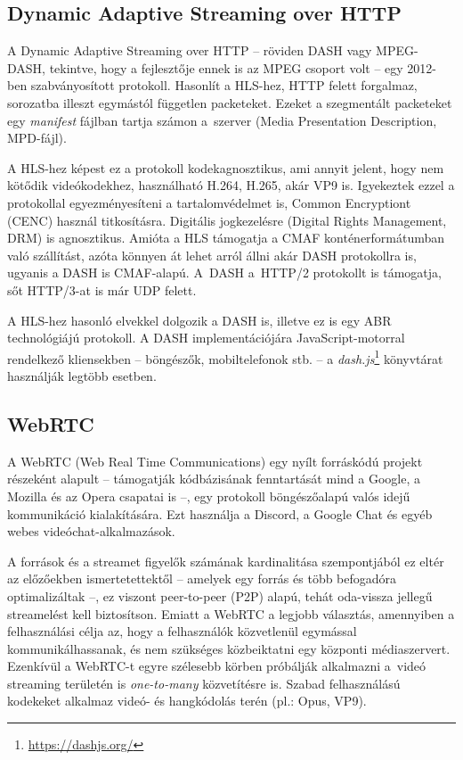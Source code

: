 \subsection{Dynamic Adaptive Streaming over HTTP}

A Dynamic Adaptive Streaming over HTTP -- röviden DASH vagy MPEG-DASH, tekintve, hogy a fejlesztője ennek is az MPEG csoport volt -- egy 2012-ben szabványosított protokoll. Hasonlít a HLS-hez, HTTP felett forgalmaz, sorozatba illeszt egymástól független packeteket. Ezeket a szegmentált packeteket egy \emph{manifest} fájlban tartja számon a~szerver (Media Presentation Description, MPD-fájl).\cite{Dash}

A HLS-hez képest ez a protokoll kodekagnosztikus, ami annyit jelent, hogy nem kötődik videókodekhez, használható H.264, H.265, akár VP9 is.\cite{DashIso} Igyekeztek ezzel a protokollal egyezményesíteni a tartalomvédelmet is, Common Encryptiont (CENC) használ titkosításra. Digitális jogkezelésre (Digital Rights Management, DRM) is agnosztikus. Amióta a HLS támogatja a CMAF konténerformátumban való szállítást, azóta könnyen át lehet arról állni akár DASH protokollra is, ugyanis a DASH is CMAF-alapú. A~DASH a~HTTP/2 protokollt is támogatja, sőt HTTP/3-at is már UDP felett.

A HLS-hez hasonló elvekkel dolgozik a DASH is, illetve ez is egy ABR technológiájú protokoll. A DASH implementációjára JavaScript-motorral rendelkező kliensekben -- böngészők, mobiltelefonok stb. -- a \emph{dash.js}\footnote{\url{https://dashjs.org/}} könyvtárat használják legtöbb esetben.

\subsection{WebRTC}

A WebRTC (Web Real Time Communications) egy nyílt forráskódú projekt részeként alapult -- támogatják kódbázisának fenntartását mind a Google, a Mozilla és az Opera csapatai is --, egy protokoll böngészőalapú valós idejű kommunikáció kialakítására. Ezt használja a Discord, a Google Chat és egyéb webes videóchat-alkalmazások.\cite{StreamingHistory}

A források és a streamet figyelők számának kardinalitása szempontjából ez eltér az előzőekben ismertetettektől -- amelyek egy forrás és több befogadóra optimalizáltak --, ez viszont peer-to-peer (P2P) alapú, tehát oda-vissza jellegű streamelést kell biztosítson. Emiatt a WebRTC a legjobb választás, amennyiben a felhasználási célja az, hogy a felhasználók közvetlenül egymással kommunikálhassanak, és nem szükséges közbeiktatni egy központi médiaszervert. Ezenkívül a WebRTC-t egyre szélesebb körben próbálják alkalmazni a~videó streaming területén is \emph{one-to-many} közvetítésre is. Szabad felhasználású kodekeket alkalmaz videó- és hangkódolás terén (pl.: Opus, VP9).\cite{WebRTC}
